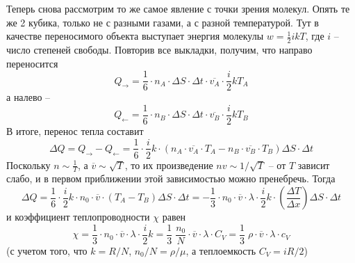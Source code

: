 Теперь снова рассмотрим то же самое явление с точки зрения молекул. Опять те же 2 кубика, только не с разными газами, а с разной температурой. Тут в качестве переносимого объекта выступает энергия молекулы $w=\frac12ikT$, где $i$ -- число степеней свободы. Повторив все выкладки, получим, что направо переносится\vspace{-5mm}
\begin{displaymath}
Q_\rightarrow =
\frac16\cdot n_A\cdot \Delta S\cdot \Delta t\cdot\overline{v_A}\cdot\frac i2kT_A
\end{displaymath}
а налево -- \vspace{-3mm}
\begin{displaymath}
Q_\leftarrow =
\frac16\cdot n_B\cdot \Delta S\cdot \Delta t\cdot\overline{v_B}\cdot\frac i2kT_B
\end{displaymath}
В итоге, перенос тепла составит\vspace{-3mm}
\begin{displaymath}
\Delta Q=Q_\rightarrow-Q_\leftarrow =
\frac16\cdot\frac i2k \cdot\left(n_A\cdot\overline{v_A}\cdot T_A - n_B\cdot\overline{v_B}\cdot T_B \right) \Delta S\cdot \Delta t
\end{displaymath}
Поскольку $n\sim\frac1T$, а $\overline{v}\sim\sqrt{T}$, то их произведение $nv\sim1/\sqrt{T}$ -- от $T$ зависит слабо, и в первом приближении этой зависимостью можно пренебречь. Тогда\vspace{-3mm}
\begin{displaymath}
\Delta Q=
\frac16\cdot\frac i2k \cdot n_0\cdot\overline{v}\cdot \left(T_A - T_B \right) \Delta S\cdot \Delta t=-\frac13\cdot n_0\cdot\overline{v}\cdot\lambda\cdot\frac i2k \cdot \left(\frac{\Delta T}{\Delta x} \right)\Delta S\cdot \Delta t
\end{displaymath}
и коэффициент теплопроводности $\chi$ равен
\begin{displaymath}
\chi=\frac13\cdot n_0\cdot\overline{v}\cdot\lambda\cdot\frac i2k =
\frac13\;\frac{n_0}N\cdot\overline{v}\cdot\lambda\cdot C_V=
\frac13\;\rho\cdot\overline{v}\cdot\lambda\cdot c_V
\end{displaymath}
(с учетом того, что $k=R/N$, $n_0/N=\rho/\mu$, а теплоемкость $C_V=iR/2$)

